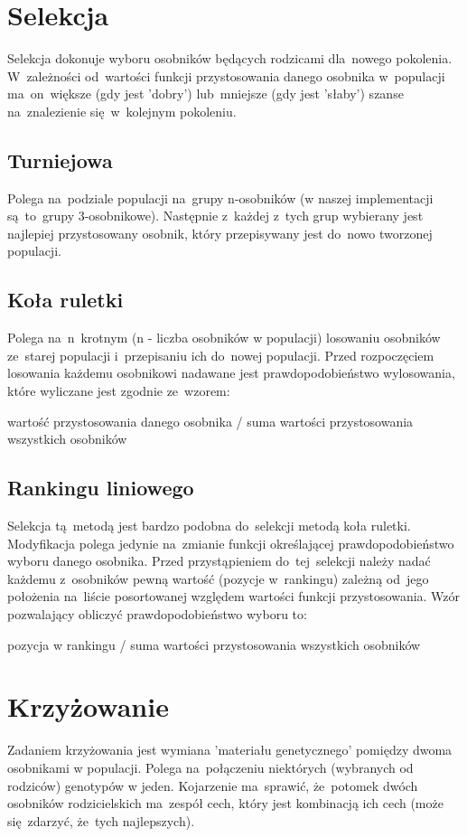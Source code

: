\documentclass[11pt]{aghdpl}
\begin{document}
\chapter{Selekcja}
\label{cha:selection}
Selekcja dokonuje wyboru osobników będących rodzicami dla~nowego pokolenia.
W~zależności od~wartości funkcji przystosowania danego osobnika w~populacji ma~on~większe (gdy jest 'dobry') lub~mniejsze 
(gdy jest 'słaby') szanse na~znalezienie się~w~kolejnym pokoleniu. 
\section{Turniejowa}
\label{sec:tournament}
Polega na~podziale populacji na~grupy n-osobników (w naszej implementacji są~to~grupy 3-osobnikowe). Następnie z~każdej z~tych grup wybierany jest najlepiej przystosowany osobnik, który przepisywany jest do~nowo tworzonej populacji.

\section{Koła ruletki}
\label{sec:roulette}
Polega na~n~krotnym (n - liczba osobników w populacji) losowaniu osobników ze~starej populacji i~przepisaniu ich do~nowej 
populacji. Przed rozpoczęciem losowania każdemu osobnikowi nadawane jest prawdopodobieństwo wylosowania, które wyliczane 
jest zgodnie ze~wzorem:
\begin{center}
wartość przystosowania danego osobnika / suma wartości przystosowania wszystkich osobników
\end{center}
 
\section{Rankingu liniowego}
\label{sec:linear}
Selekcja tą~metodą jest bardzo podobna do~selekcji metodą koła ruletki. Modyfikacja polega jedynie na~zmianie funkcji 
określającej prawdopodobieństwo wyboru danego osobnika. Przed przystąpieniem do~tej~selekcji należy nadać każdemu z~osobników pewną wartość (pozycje w~rankingu) zależną od~jego położenia na~liście posortowanej względem wartości funkcji 
przystosowania. Wzór pozwalający obliczyć prawdopodobieństwo wyboru to:
\begin{center}
pozycja w rankingu / suma wartości przystosowania wszystkich osobników
\end{center}

\chapter{Krzyżowanie}
\label{cha:crossing}
Zadaniem krzyżowania jest wymiana 'materiału genetycznego' pomiędzy dwoma osobnikami w populacji. Polega na~połączeniu 
niektórych (wybranych od rodziców) genotypów w jeden. Kojarzenie ma~sprawić, że~potomek dwóch osobników rodzicielskich 
ma~zespół cech, który jest kombinacją ich cech (może się~zdarzyć, że~tych najlepszych). 
 
\end{document}
